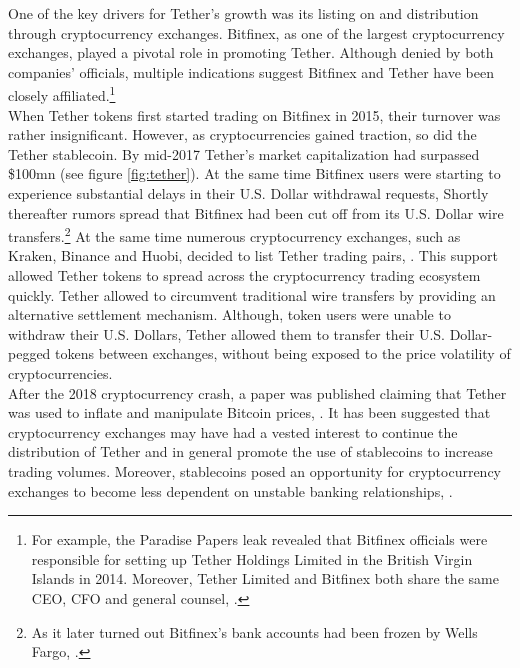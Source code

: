 \documentclass[conference]{IEEEtran}
\begin{document}
One of the key drivers for Tether's growth was its listing on and distribution through cryptocurrency exchanges. Bitfinex, as one of the largest cryptocurrency exchanges, played a pivotal role in promoting Tether. Although denied by both companies' officials, multiple indications suggest Bitfinex and Tether have been closely affiliated.\footnote{For example, the Paradise Papers leak revealed that Bitfinex officials were responsible for setting up Tether Holdings Limited in the British Virgin Islands in 2014. Moreover, Tether Limited and Bitfinex both share the same CEO, CFO and general counsel, \cite{Tether2}\cite{Bitfinex}.}\\

When Tether tokens first started trading on Bitfinex in 2015, their turnover was rather insignificant. However, as cryptocurrencies gained traction, so did the Tether stablecoin. By mid-2017 Tether's market capitalization had surpassed \$100mn (see figure \ref{fig:tether}). At the same time Bitfinex users were starting to experience substantial delays in their U.S. Dollar withdrawal requests, \cite{Bloomberg.} Shortly thereafter rumors spread that Bitfinex had been cut off from its U.S. Dollar wire transfers.\footnote{As it later turned out Bitfinex's bank accounts had been frozen by Wells Fargo, \cite{Buntinx}.} At the same time numerous cryptocurrency exchanges, such as Kraken, Binance and Huobi, decided to list Tether trading pairs, \cite{Kraken}\cite{Binance}\cite{Huobi}. This support allowed Tether tokens to spread across the cryptocurrency trading ecosystem quickly. Tether allowed to circumvent traditional wire transfers by providing an alternative settlement mechanism. Although, token users were unable to withdraw their U.S. Dollars, Tether allowed them to transfer their U.S. Dollar-pegged tokens between exchanges, without being exposed to the price volatility of cryptocurrencies.\\

After the 2018 cryptocurrency crash, a paper was published claiming that Tether was used to inflate and manipulate Bitcoin prices, \cite{Griffin}. It has been suggested that cryptocurrency exchanges may have had a vested interest to continue the distribution of Tether and in general promote the use of stablecoins to increase trading volumes. Moreover, stablecoins posed an opportunity for cryptocurrency exchanges to become less dependent on unstable banking relationships, \cite{Upson}.\\
\end{document}

